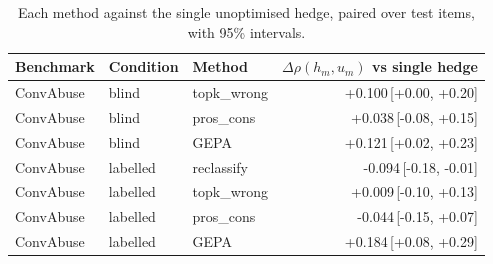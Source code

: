 \begin{table}[t]
\centering
\small
\begin{tabular}{lllr}
\hline
Benchmark & Condition & Method & $\Delta\rho(h_m,u_m)$ vs single hedge \\
\hline
ConvAbuse & blind & topk\_wrong & +0.100{\scriptsize\,[+0.00, +0.20]} \\
ConvAbuse & blind & pros\_cons & +0.038{\scriptsize\,[-0.08, +0.15]} \\
ConvAbuse & blind & GEPA & +0.121{\scriptsize\,[+0.02, +0.23]} \\
ConvAbuse & labelled & reclassify & -0.094{\scriptsize\,[-0.18, -0.01]} \\
ConvAbuse & labelled & topk\_wrong & +0.009{\scriptsize\,[-0.10, +0.13]} \\
ConvAbuse & labelled & pros\_cons & -0.044{\scriptsize\,[-0.15, +0.07]} \\
ConvAbuse & labelled & GEPA & +0.184{\scriptsize\,[+0.08, +0.29]} \\
\hline
\end{tabular}
\caption{Each method against the single unoptimised hedge, paired over test items, with 95\% intervals.}
\label{tab:paired-methods}
\end{table}